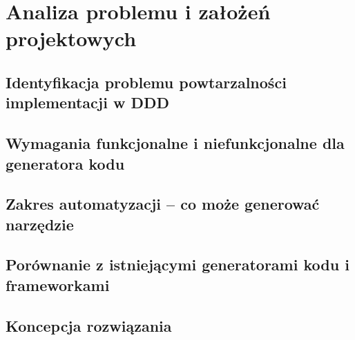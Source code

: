 \newpage
\section{Analiza problemu i założeń projektowych}

\subsection{Identyfikacja problemu powtarzalności implementacji w DDD}

\subsection{Wymagania funkcjonalne i niefunkcjonalne dla generatora kodu}

\subsection{Zakres automatyzacji – co może generować narzędzie}

\subsection{Porównanie z istniejącymi generatorami kodu i frameworkami}

\subsection{Koncepcja rozwiązania}